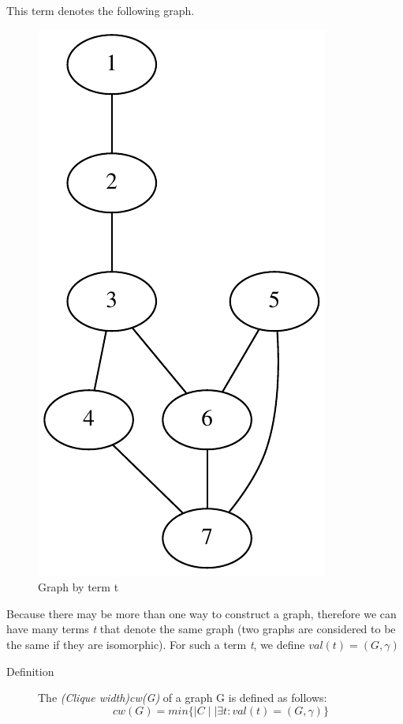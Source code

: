 \documentclass[a4paper, 12pt]{article}
\begin{document}
This term denotes the following graph.\\

\begin{figure}[H]
\centering{}
\includegraphics[scale=0.5]{image/graph_by_t}
\caption{Graph by term t}
\end{figure}

Because there may be more than one way to construct a graph, therefore we can have many terms \textit {t }that denote the same graph (two graphs are considered to be the same if they are isomorphic). For such a term \textit {t}, we define \textit {$val(t)=(G,\gamma)$} 

\begin{description}
\item [{Definition}] \cite {vadim-lozin}The \textit {(Clique width)}\textit {cw(G)} of a graph G  is defined as follows: 
\[
cw(G)=min\{\mid C\mid\mid\exists t:val(t)=(G,\gamma)\}
\]
\end{description}
\end{document}
